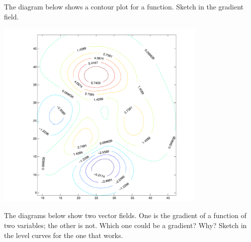 \documentclass[M3_Night4_Solutions]{subfiles}
\begin{document}
\be[resume=exercises, label=\textbf{Exercise} (\arabic*)]

\item The diagram below shows a contour plot for a function. Sketch in the gradient field.

\includegraphics[width=4in]{figs/LabeledContourPlot.pdf}

\item The diagrams below show two vector fields.  One is the gradient of a function of two variables; the other is not.  Which one could be a gradient?  Why?  Sketch in the level curves for the one that works.
\end{document}
